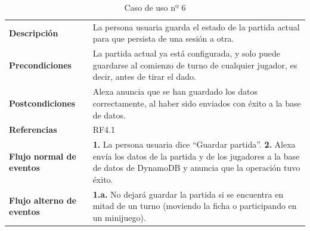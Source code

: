 \begin{table}[H]
	\centering
	\begin{tabular}{|p{3cm}|p{12cm}|}
		\hline
		\rowcolor{lightgray}
		\multicolumn{2}{|c|}{\textbf{CU06}: Guardar la partida} \\
		\hline
		\textbf{Descripción} & La persona usuaria guarda el estado de la partida actual para que persista de una sesión a otra. \vspace{0.2cm} \\
		\hline
		\textbf{Precondiciones} & La partida actual ya está configurada, y solo puede guardarse al comienzo de turno de cualquier jugador, es decir, antes de tirar el dado. \vspace{0.2cm} \\
		\hline
		\textbf{Postcondiciones} & Alexa anuncia que se han guardado los datos correctamente, al haber sido enviados con éxito a la base de datos. \vspace{0.2cm} \\
		\hline
		\textbf{Referencias} & RF4.1 \vspace{0.2cm} \\
		\hline
		\textbf{Flujo normal de eventos} &
		\textbf{1.} La persona usuaria dice \enquote{Guardar partida}. \newline
		\vspace{0.2cm}
		\textbf{2.} Alexa envía los datos de la partida y de los jugadores a la base de datos de DynamoDB y anuncia que la operación tuvo éxito.
		\vspace{0.2cm}\\
		\hline
		\textbf{Flujo alterno de eventos} &
		\textbf{1.a.} No dejará guardar la partida si se encuentra en mitad de un turno (moviendo la ficha o participando en un minijuego). \vspace{0.2cm} \\
		\hline
	\end{tabular}
	\caption{Caso de uso nº 6}
	\label{tab:CU06}
\end{table}

